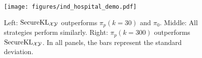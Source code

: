 \begin{figure}[t]
  \centering
  \texttt{[image: figures/ind\_hospital\_demo.pdf]}
  \caption{Left: $\mathrm{Secure}\mathrm{KL}_{\mathcal{X}\mathcal{Y}}$ outperforms $\pi_p(k=30)$ and $\pi_0$. Middle: All strategies perform similarly. Right: $\pi_p(k=300)$ outperforms $\mathrm{Secure}\mathrm{KL}_{\mathcal{X}\mathcal{Y}}$. In all panels, the bars represent the standard deviation.}
  \label{fig:hos_auc}
\end{figure}

